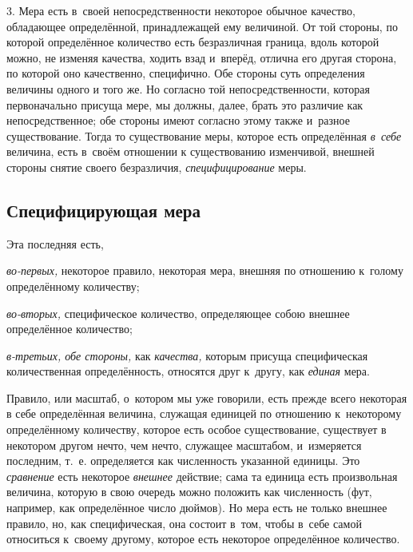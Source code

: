 3. Мера есть в~своей непосредственности некоторое обычное качество, обладающее
определённой, принадлежащей ему величиной. От той стороны, по которой
определённое количество есть безразличная граница, вдоль которой можно, не
изменяя качества, ходить взад и~вперёд, отлична его другая сторона, по которой
оно качественно, специфично. Обе стороны суть определения величины одного и
того же. Но согласно той непосредственности, которая первоначально присуща
мере, мы должны, далее, брать это различие как непосредственное; обе стороны
имеют согласно этому также и~разное существование. Тогда то существование меры,
которое есть определённая {\em в~себе} величина, есть в~своём отношении к
существованию изменчивой, внешней стороны снятие своего безразличия,
{\em специфицирование} меры.

\subsection{Специфицирующая мера}

Эта последняя есть,

{\em во-первых,} некоторое правило, некоторая мера, внешняя
по отношению к~голому определённому количеству;

{\em во-вторых,} специфическое количество, определяющее собою внешнее
определённое количество;

{\em в-третьих, обе стороны,} как {\em качества,} которым присуща
специфическая количественная определённость, относятся друг к~другу, как
{\em единая} мера.


Правило, или масштаб, о~котором мы уже говорили, есть прежде всего некоторая в
себе определённая величина, служащая единицей по отношению к~некоторому
определённому количеству, которое есть особое существование, существует в
некотором другом нечто, чем нечто, служащее масштабом, и~измеряется последним,
т.~е. определяется как численность указанной единицы. Это {\em сравнение} есть
некоторое {\em внешнее} действие; сама та единица есть произвольная величина, которую
в свою очередь можно положить как численность (фут, например, как определённое
число дюймов). Но мера есть не только внешнее правило, но, как специфическая,
она состоит в~том, чтобы в~себе самой относиться к~своему другому, которое есть
некоторое определённое количество.

